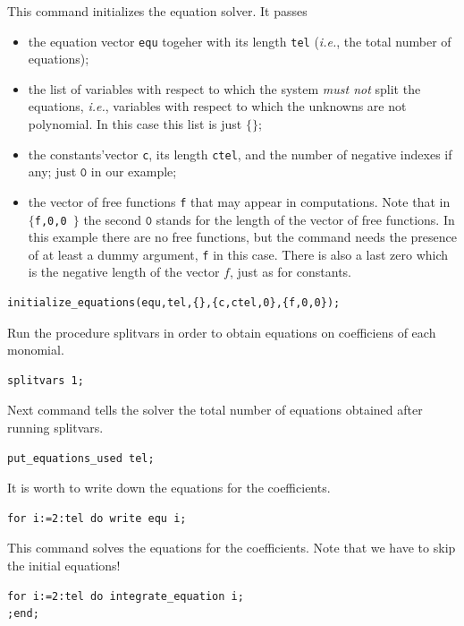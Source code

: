 This command initializes the equation solver.  It passes
\begin{itemize}
  \item the equation vector \texttt{equ} togeher with its length \texttt{tel}
    (\emph{i.e.}, the total number of equations);
  \item the list of variables with respect to which the system \emph{must not}
    split the equations, \emph{i.e.}, variables with respect to which the
    unknowns are not polynomial. In this case this list is just $\{\}$;
  \item the constants'vector \texttt{c}, its length \texttt{ctel}, and the
    number of negative indexes if any; just $\texttt{0}$ in our example;
  \item the vector of free functions \texttt{f} that may appear in
    computations. Note that in \texttt{$\{$f,0,0 $\}$} the second $\texttt{0}$
    stands for the length of the vector of free functions. In this example
    there are no free functions, but the command needs the presence of at least
    a dummy argument, \texttt{f} in this case. There is also a last zero which
    is the negative length of the vector $f$, just as for constants.
  \end{itemize}
  \hypertarget{operator:CDIFF_INITIALIZE_EQUATIONS}{}
\begin{verbatim}
initialize_equations(equ,tel,{},{c,ctel,0},{f,0,0});
\end{verbatim}

Run the procedure splitvars in order to obtain equations on coefficiens
of each monomial.
\begin{verbatim}
splitvars 1;
\end{verbatim}

Next command tells the solver the total number of equations obtained
after running splitvars.
\hypertarget{operator:CDIFF_PUT_EQUATIONS_USED}{}
\begin{verbatim}
put_equations_used tel;
\end{verbatim}

It is worth to write down the equations for the coefficients.
\begin{verbatim}
for i:=2:tel do write equ i;
\end{verbatim}

This command solves the equations for the coefficients.
Note that we have to skip the initial equations!
\hypertarget{operator:CDIFF_INTEGRATE_EQUATION}{}
\begin{verbatim}
for i:=2:tel do integrate_equation i;
;end;
\end{verbatim}


